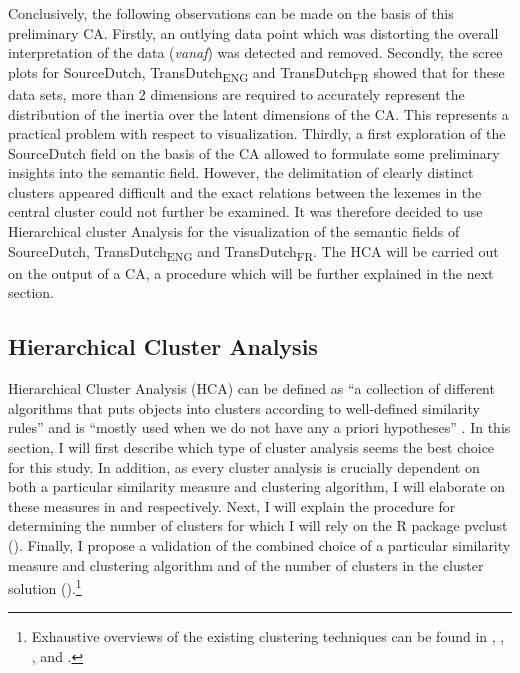 Conclusively, the following observations can be made on the basis of this preliminary CA. Firstly, an outlying data point which was distorting the overall interpretation of the data (\textit{vanaf}) was detected and removed. Secondly, the scree plots for SourceDutch, TransDutch\textsubscript{ENG} and TransDutch\textsubscript{FR} showed that for these data sets, more than 2 dimensions are required to accurately represent the distribution of the inertia over the latent dimensions of the CA. This represents a practical problem with respect to visualization. Thirdly, a first exploration of the SourceDutch field on the basis of the CA allowed to formulate some preliminary insights into the semantic field. However, the delimitation of clearly distinct clusters appeared difficult and the exact relations between the lexemes in the central cluster could not further be examined. It was therefore decided to use Hierarchical cluster Analysis for the visualization of the semantic fields of SourceDutch, TransDutch\textsubscript{ENG} and TransDutch\textsubscript{FR}. The HCA will be carried out on the output of a CA, a procedure which will be further explained in the next section.

\subsection{Hierarchical Cluster Analysis}
\label{sec:3.7.2}  
Hierarchical Cluster Analysis (HCA) can be defined as “a collection of different algorithms that puts objects into clusters according to well-defined similarity rules” and is “mostly used when we do not have any a priori hypotheses” \citep[406]{glynn_cluster_2014}. In this section, I will first describe which type of cluster analysis seems the best choice for this study. In addition, as every cluster analysis is crucially dependent on both a particular similarity measure and clustering algorithm, I will elaborate on these measures in  and  respectively. Next, I will explain the procedure for determining the number of clusters for which I will rely on the R package pvclust \citep{suzuki_pvclust:_2006} (). Finally, I propose a validation of the combined choice of a particular similarity measure and clustering algorithm and of the number of clusters in the cluster solution ().\footnote{Exhaustive overviews of the existing clustering techniques can be found in \citet[495--523]{manning_foundations_1999}, \citet[138--148]{baayen_analyzing_2008},  \citet[71--110]{everitt_cluster_2011}, \citet[336--349]{gries_statistics_2013} and \citet{glynn_cluster_2014}.}

